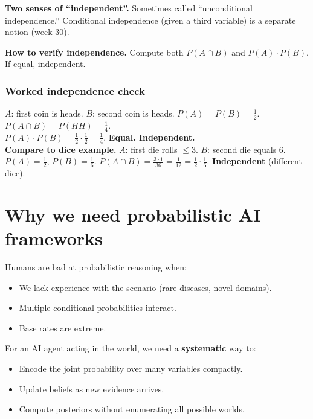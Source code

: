 \documentclass[11pt, a4paper]{article}
\begin{document}
\textbf{Two senses of ``independent''.} Sometimes called ``unconditional independence.'' Conditional independence (given a third variable) is a separate notion (week 30).

\textbf{How to verify independence.} Compute both $P(A \cap B)$ and $P(A) \cdot P(B)$. If equal, independent.

\subsubsection*{Worked independence check}

\begin{exbox}
$A$: first coin is heads. $B$: second coin is heads. $P(A) = P(B) = \frac{1}{2}$.\\[0.3em]
$P(A \cap B) = P(HH) = \frac{1}{4}$.\\[0.3em]
$P(A) \cdot P(B) = \frac{1}{2} \cdot \frac{1}{2} = \frac{1}{4}$. \textbf{Equal. Independent.}\\[0.3em]
\textbf{Compare to dice example.} $A$: first die rolls $\le 3$. $B$: second die equals 6. $P(A) = \frac{1}{2}$, $P(B) = \frac{1}{6}$. $P(A \cap B) = \frac{3 \cdot 1}{36} = \frac{1}{12} = \frac{1}{2} \cdot \frac{1}{6}$. \textbf{Independent} (different dice).
\end{exbox}

\section{Why we need probabilistic AI frameworks}

Humans are bad at probabilistic reasoning when:
\begin{itemize}
  \item We lack experience with the scenario (rare diseases, novel domains).
  \item Multiple conditional probabilities interact.
  \item Base rates are extreme.
\end{itemize}

For an AI agent acting in the world, we need a \textbf{systematic} way to:
\begin{itemize}
  \item Encode the joint probability over many variables compactly.
  \item Update beliefs as new evidence arrives.
  \item Compute posteriors without enumerating all possible worlds.
\end{itemize}
\end{document}
